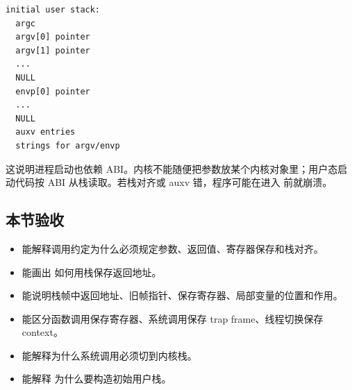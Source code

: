 \begin{lstlisting}
initial user stack:
  argc
  argv[0] pointer
  argv[1] pointer
  ...
  NULL
  envp[0] pointer
  ...
  NULL
  auxv entries
  strings for argv/envp
\end{lstlisting}

这说明进程启动也依赖 ABI。内核不能随便把参数放某个内核对象里；用户态启动代码按 ABI 从栈读取。若栈对齐或 auxv 错，程序可能在进入  前就崩溃。

\subsection{本节验收}

\begin{rubricbox}
\begin{itemize}
\tightlist
\item 能解释调用约定为什么必须规定参数、返回值、寄存器保存和栈对齐。
\item 能画出  如何用栈保存返回地址。
\item 能说明栈帧中返回地址、旧帧指针、保存寄存器、局部变量的位置和作用。
\item 能区分函数调用保存寄存器、系统调用保存 trap frame、线程切换保存 context。
\item 能解释为什么系统调用必须切到内核栈。
\item 能解释  为什么要构造初始用户栈。
\end{itemize}
\end{rubricbox}
